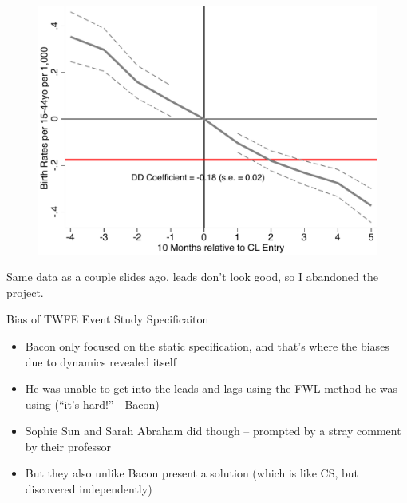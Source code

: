 \documentclass{beamer}
\begin{document}
\begin{frame}[plain]
	\begin{figure}
	\includegraphics[scale=0.5]{./lecture_includes/br1544.pdf}
	\end{figure}
	
Same data as a couple slides ago, leads don't look good, so I abandoned the project. 
	
\end{frame}

\begin{frame}{Bias of TWFE Event Study Specificaiton}

\begin{itemize}
\item Bacon only focused on the static specification, and that's where the biases due to dynamics revealed itself
\item He was unable to get into the leads and lags using the FWL method he was using (``it's hard!'' - Bacon)
\item Sophie Sun and Sarah Abraham did though -- prompted by a stray comment by their professor
\item But they also unlike Bacon present a solution (which is like CS, but discovered independently)
\end{itemize}

\end{frame}
\end{document}
